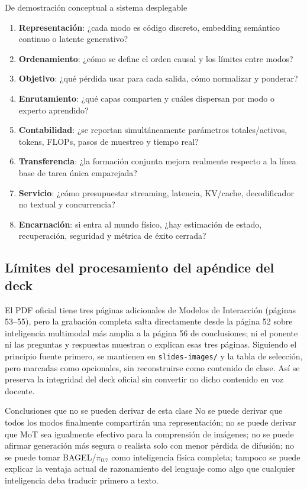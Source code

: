 \begin{knowledgebox}{De demostración conceptual a sistema desplegable}
\begin{enumerate}
  \item \textbf{Representación}: ¿cada modo es código discreto, embedding semántico continuo o latente generativo?
  \item \textbf{Ordenamiento}: ¿cómo se define el orden causal y los límites entre modos?
  \item \textbf{Objetivo}: ¿qué pérdida usar para cada salida, cómo normalizar y ponderar?
  \item \textbf{Enrutamiento}: ¿qué capas comparten y cuáles dispersan por modo o experto aprendido?
  \item \textbf{Contabilidad}: ¿se reportan simultáneamente parámetros totales/activos, tokens, FLOPs, pasos de muestreo y tiempo real?
  \item \textbf{Transferencia}: ¿la formación conjunta mejora realmente respecto a la línea base de tarea única emparejada?
  \item \textbf{Servicio}: ¿cómo presupuestar streaming, latencia, KV/cache, decodificador no textual y concurrencia?
  \item \textbf{Encarnación}: si entra al mundo físico, ¿hay estimación de estado, recuperación, seguridad y métrica de éxito cerrada?
\end{enumerate}
\end{knowledgebox}

\subsection{Límites del procesamiento del apéndice del deck}

El PDF oficial tiene tres páginas adicionales de Modelos de Interacción (páginas 53--55), pero la grabación completa salta directamente desde la página 52 sobre inteligencia multimodal más amplia a la página 56 de conclusiones; ni el ponente ni las preguntas y respuestas muestran o explican esas tres páginas. Siguiendo el principio fuente primero, se mantienen en \texttt{slides-images/} y la tabla de selección, pero marcadas como opcionales, sin reconstruirse como contenido de clase. Así se preserva la integridad del deck oficial sin convertir no dicho contenido en voz docente.

\begin{warningbox}{Conclusiones que no se pueden derivar de esta clase}
No se puede derivar que todos los modos finalmente compartirán una representación; no se puede derivar que MoT sea igualmente efectivo para la comprensión de imágenes; no se puede afirmar generación más segura o realista solo con menor pérdida de difusión; no se puede tomar BAGEL/$\pi_{0.7}$ como inteligencia física completa; tampoco se puede explicar la ventaja actual de razonamiento del lenguaje como algo que cualquier inteligencia deba traducir primero a texto.
\end{warningbox}


